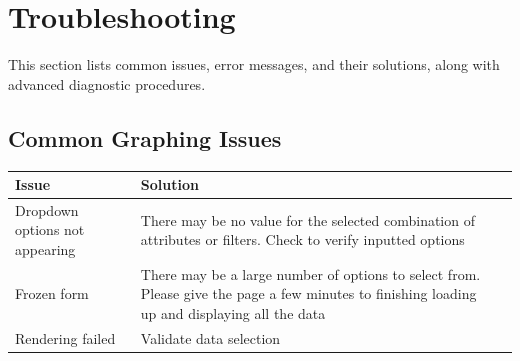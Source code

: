 \documentclass[12pt]{article}
\begin{document}
\section{Troubleshooting}

This section lists common issues, error messages, and their solutions, along
with advanced diagnostic procedures.

\subsection{Common Graphing Issues}

\begin{table}[H]
    \centering
    \begin{tabularx}{\textwidth}{lXl}
        \toprule
        \textbf{Issue} & \textbf{Solution} \\
        \midrule
        Dropdown options not appearing & There may be no value for the
        selected combination of attributes or filters. Check to verify inputted
        options \newline \\
        Frozen form & There may be a large number of options to select from.
        Please give the page a few minutes to finishing loading up and
        displaying all the data \newline \\
        Rendering failed & Validate data selection \\
        \bottomrule
    \end{tabularx}
\end{table}
\end{document}
